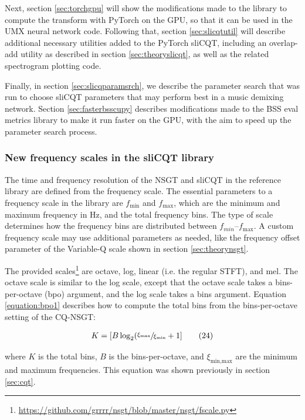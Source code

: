 \documentclass[report.tex]{subfiles}
\begin{document}
Next, section \ref{sec:torchgpu} will show the modifications made to the library to compute the transform with PyTorch on the GPU, so that it can be used in the UMX neural network code. Following that, section \ref{sec:slicqtutil} will describe additional necessary utilities added to the PyTorch sliCQT, including an overlap-add utility as described in section \ref{sec:theoryslicqt}, as well as the related spectrogram plotting code.

Finally, in section \ref{sec:slicqparamsrch}, we describe the parameter search that was run to choose sliCQT parameters that may perform best in a music demixing network. Section \ref{sec:fasterbsscupy} describes modifications made to the BSS eval metrics library to make it run faster on the GPU, with the aim to speed up the parameter search process.

\subsubsection{New frequency scales in the sliCQT library}
\label{sec:improvelib}

The time and frequency resolution of the NSGT and sliCQT in the reference library are defined from the frequency scale. The essential parameters to a frequency scale in the library are $f_{\text{min}}$ and $f_{\text{max}}$, which are the minimum and maximum frequency in Hz, and the total frequency bins. The type of scale determines how the frequency bins are distributed between $f_{min}$--$f_{\text{max}}$. A custom frequency scale may use additional parameters as needed, like the frequency offset parameter of the Variable-Q scale shown in section \ref{sec:theorynsgt}.

The provided scales\footnote{\url{https://github.com/grrrr/nsgt/blob/master/nsgt/fscale.py}} are octave, log, linear (i.e. the regular STFT), and mel. The octave scale is similar to the log scale, except that the octave scale takes a bins-per-octave (bpo) argument, and the log scale takes a bins argument. Equation \eqref{equation:bpo1} describes how to compute the total bins from the bins-per-octave setting of the CQ-NSGT:

\begin{align}
	K = [B \log_{2}(\sfrac{\xi_{\text{max}}}{\xi_{\text{min}}} + 1]\tag{24}\label{equation:bpo1}
\end{align}

where $K$ is the total bins, $B$ is the bins-per-octave, and $\xi_{\text{min,max}}$ are the minimum and maximum frequencies. This equation was shown previously in section \ref{sec:cqt}.
\end{document}
